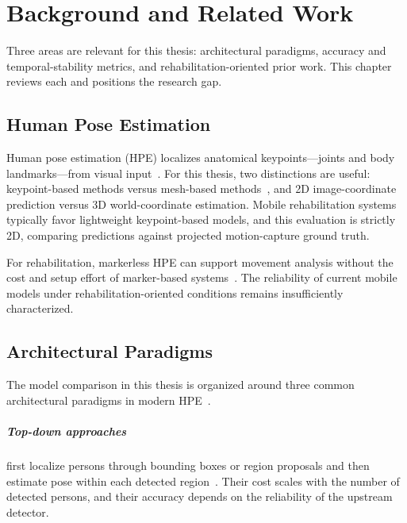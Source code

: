 \chapter{Background and Related Work}
\label{ch:background}

Three areas are relevant for this thesis: architectural paradigms, accuracy and temporal-stability metrics, and rehabilitation-oriented prior work. This chapter reviews each and positions the research gap.


\section{Human Pose Estimation}
\label{sec:hpe-fundamentals}

Human pose estimation (HPE) localizes anatomical keypoints---joints and body landmarks---from visual input~\cite{zheng2023deep}. For this thesis, two distinctions are useful: keypoint-based methods versus mesh-based methods~\cite{gao2025systematic}, and 2D image-coordinate prediction versus 3D world-coordinate estimation. Mobile rehabilitation systems typically favor lightweight keypoint-based models, and this evaluation is strictly 2D, comparing predictions against projected motion-capture ground truth.

For rehabilitation, markerless HPE can support movement analysis without the cost and setup effort of marker-based systems~\cite{hellsten2021potential, debnath2022review}. The reliability of current mobile models under rehabilitation-oriented conditions remains insufficiently characterized.


\section{Architectural Paradigms}
\label{sec:architectures}

The model comparison in this thesis is organized around three common architectural paradigms in modern HPE~\cite{zheng2023deep}.

\paragraph{Top-down approaches} first localize persons through bounding boxes or region proposals and then estimate pose within each detected region~\cite{toshev2014deeppose, newell2016stacked, xiao2018simple, sun2019hrnet}. Their cost scales with the number of detected persons, and their accuracy depends on the reliability of the upstream detector.

